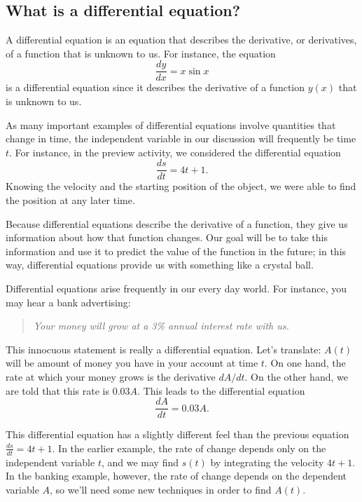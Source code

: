 \subsection*{What is a differential equation?}  

A differential equation is an equation that describes the derivative,
or derivatives, of a function that is unknown to us.  
For instance, the equation
$$
\frac{dy}{dx} = x\sin x
$$
is a differential equation since it describes the derivative of a
function $y(x)$ that is unknown to us.

As many important examples of differential equations involve quantities
that change in time, the independent variable in our discussion will
frequently be time 
$t$.
For instance, in the preview activity, we considered the
differential equation
$$
\frac{ds}{dt} = 4t + 1.
$$
Knowing the velocity and the starting position of the object, we were
able to find the position at any later time.

Because differential equations describe the derivative of a function,
they give us information about how that function changes.  Our goal
will be to take this information and use it to predict the value of
the function in the future; in this way, differential equations
provide us with something like a crystal ball.

Differential equations arise frequently in our every day world.  For
instance, you may hear a bank advertising:

\begin{quote}{\em
    Your money will grow at a 3\% annual interest rate with us.
}
\end{quote}

This innocuous statement is really a differential equation.  Let's
translate:  $A(t)$ will be amount of money you have in your account at
time $t$.  On one hand, the rate at which your money grows is the
derivative $dA/dt$.  On the other hand, we are told that this rate is
$0.03 A$.  This leads to the differential equation
$$
\frac{dA}{dt} = 0.03 A.
$$

This differential equation has a slightly different feel than the
previous equation $\frac{ds}{dt} = 4t+1$.  In the
earlier example, the rate of change depends only on the independent
variable $t$, and we may find $s(t)$ by integrating the velocity $4t+1$.  
In the banking example, however, the rate of change depends
on the dependent variable $A$, so we'll need some new techniques in order to
find $A(t)$.  

